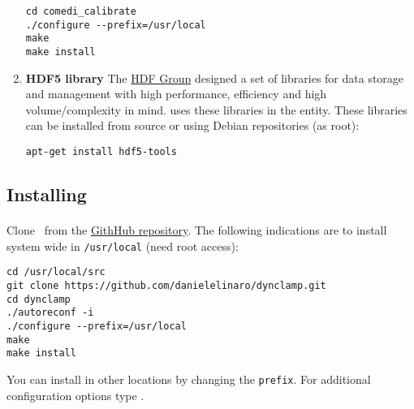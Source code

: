 \begin{enumerate}
\begin{lstlisting}
cd comedi_calibrate
./configure --prefix=/usr/local
make
make install
\end{lstlisting}

\item \textbf{HDF5 library} 
The \href{http://www.hdfgroup.org/HDF5/}{HDF Group} designed a set of libraries for data storage and management with high performance, efficiency and high volume/complexity in mind. \textbf{\progname} uses these libraries in the  entity. These libraries can be installed from source or using Debian repositories (as root):
\begin{lstlisting}
apt-get install hdf5-tools
\end{lstlisting}


\end{enumerate}

\subsection{Installing \progname} 
\label{install:program}
\paragraph{}
Clone \progname\ from the \href{https://github.com/danielelinaro/dynclamp}{GithHub repository}. The following indications are to install system wide in \texttt{/usr/local} (need root access):
\begin{lstlisting}
cd /usr/local/src
git clone https://github.com/danielelinaro/dynclamp.git
cd dynclamp
./autoreconf -i
./configure --prefix=/usr/local
make
make install
\end{lstlisting}
You can install in other locations by changing the \texttt{prefix}.
For additional configuration options type .

